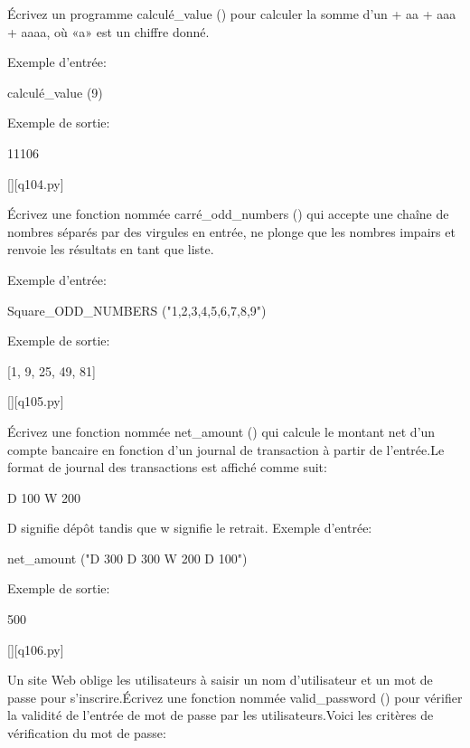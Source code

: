         \question
        Écrivez un programme calculé\_value () pour calculer la somme d'un + aa + aaa + aaaa, où «a» est un chiffre donné.

Exemple d'entrée:

calculé\_value (9)

Exemple de sortie:

11106
        \par
        \renewcommand{\nomfichier}{q104.py}
        \begin{solution}
            \pythonfile{\chemincode \nomfichier}[][\nomfichier]
        \end{solution}
        

        \question
        Écrivez une fonction nommée carré\_odd\_numbers () qui accepte une chaîne de nombres séparés par des virgules en entrée, ne plonge que les nombres impairs et renvoie les résultats en tant que liste.

Exemple d'entrée:

Square\_ODD\_NUMBERS ("1,2,3,4,5,6,7,8,9")

Exemple de sortie:

[1, 9, 25, 49, 81]
        \par
        \renewcommand{\nomfichier}{q105.py}
        \begin{solution}
            \pythonfile{\chemincode \nomfichier}[][\nomfichier]
        \end{solution}
        

        \question
        Écrivez une fonction nommée net\_amount () qui calcule le montant net d'un compte bancaire en fonction d'un journal de transaction à partir de l'entrée.Le format de journal des transactions est affiché comme suit:

D 100
W 200

D signifie dépôt tandis que w signifie le retrait.
Exemple d'entrée:

net\_amount ("D 300 D 300 W 200 D 100")

Exemple de sortie:

500
        \par
        \renewcommand{\nomfichier}{q106.py}
        \begin{solution}
            \pythonfile{\chemincode \nomfichier}[][\nomfichier]
        \end{solution}
        

        \question
        Un site Web oblige les utilisateurs à saisir un nom d'utilisateur et un mot de passe pour s'inscrire.Écrivez une fonction nommée valid\_password () pour vérifier la validité de l'entrée de mot de passe par les utilisateurs.Voici les critères de vérification du mot de passe:

